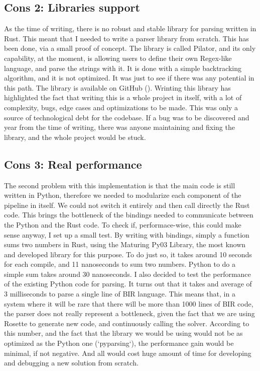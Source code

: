 \subsection[short]{Cons 2: Libraries support}
As the time of writing, there is no robust and stable library for parsing written
in Rust. This meant that I needed to write a parser library from scratch. This has
been done, via a small proof of concept. The library is called Pilator, and its
only capability, at the moment, is allowing users to define their own Regex-like
language, and parse the strings with it. It is done with a simple backtracking
algorithm, and it is not optimized. It was just to see if there was any
potential in this path. The library is available on GitHub (\cite{pilator}).
Wrinting this library has highlighted the fact that writing this is a whole
project in itself, with a lot of complexity, bugs, edge cases and optimizations to
be made. This was only a source of technological debt for the codebase. If a bug
was to be discovered and year from the time of writing, there was anyone
maintaining and fixing the library, and the whole project would be stuck.

\subsection[short]{Cons 3: Real performance}
The second problem with this implementation is that the main code is still written
in Python, therefore we needed to modularize each component of the pipeline in
itself. We could not switch it entirely and then call directly the Rust code.
This brings the bottleneck of the bindings needed to communicate between the
Python and the Rust code. To check if, performace-wise, this could make sense anyway,
I set up a small test. By writing with bindings, simply a function sums two
numbers in Rust, using the Maturing Py03 Library, the most known and developed
library for this purpose. To do just so, it takes around 10 seconds for each
compile, and 11 nanoseconds to sum two numbers. Python to do a simple sum takes
around 30 nanoseconds. I also decided to test the performance of the existing Python
code for parsing. It turns out that it takes and average of 3 milliseconds to
parse a single line of BIR language. This means that, in a system where it will
be rare that there will be more than 1000 lines of BIR code, the parser does not
really represent a bottleneck, given the fact that we are using Rosette to
generate new code, and continuously calling the solver. According to this number,
and the fact that the library we would be using would not be as optimized as the
Python one (`pyparsing`), the performance gain would be minimal, if not negative.
And all would cost huge amount of time for developing and debugging a new
solution from scratch.

